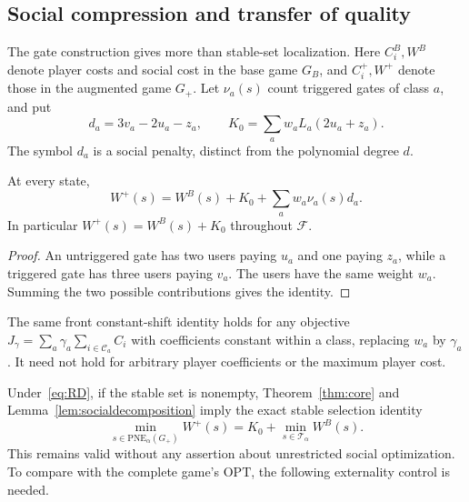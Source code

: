 \documentclass[manuscript,review,anonymous]{acmart}
\newcommand{\PNE}{\mathrm{PNE}}
\newcommand{\OPT}{\mathrm{OPT}}
\newcommand{\F}{\mathcal F}
\begin{document}
\subsection{Social compression and transfer of quality}\label{sec:social}
The gate construction gives more than stable-set localization. Here $C_i^B,W^B$ denote player costs and social cost in the base game $G_B$, and $C_i^+,W^+$ denote those in the augmented game $G_+$. Let $\nu_a(s)$ count triggered gates of class $a$, and put
\begin{equation}\label{eq:socialgate}
 d_a=3v_a-2u_a-z_a,\qquad
 K_0=\sum_aw_aL_a(2u_a+z_a).
\end{equation}
The symbol $d_a$ is a social penalty, distinct from the polynomial degree $d$.
\begin{lemma}\label{lem:socialdecomposition}
At every state,
\begin{equation}\label{eq:allsocial}
 W^+(s)=W^B(s)+K_0+\sum_aw_a\nu_a(s)d_a.
\end{equation}
In particular $W^+(s)=W^B(s)+K_0$ throughout $\F$.
\end{lemma}
\begin{proof}
An untriggered gate has two users paying $u_a$ and one paying $z_a$, while a triggered gate has three users paying $v_a$. The users have the same weight $w_a$. Summing the two possible contributions gives the identity.
\end{proof}
The same front constant-shift identity holds for any objective $J_\gamma=\sum_a\gamma_a\sum_{i\in\mathcal C_a}C_i$ with coefficients constant within a class, replacing $w_a$ by $\gamma_a$. It need not hold for arbitrary player coefficients or the maximum player cost.

Under~\eqref{eq:RD}, if the stable set is nonempty, Theorem~\ref{thm:core} and Lemma~\ref{lem:socialdecomposition} imply the exact stable selection identity
\begin{equation}\label{eq:stableselection}
 \min_{s\in\PNE_\alpha(G_+)}W^+(s)
 =K_0+\min_{s\in\mathcal T_\alpha}W^B(s).
\end{equation}
This remains valid without any assertion about unrestricted social optimization. To compare with the complete game's $\OPT$, the following externality control is needed.
\end{document}
